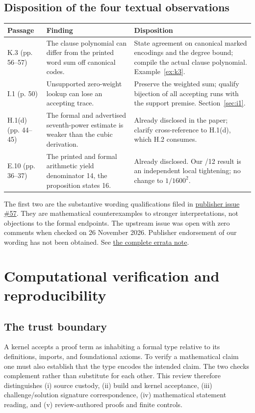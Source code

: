 \documentclass[11pt,letterpaper]{article}
\theoremstyle{definition}\newtheorem{definition}[theorem]{Definition}\newtheorem{example}[theorem]{Example}
\theoremstyle{remark}\newtheorem{remark}[theorem]{Remark}
\newcommand{\aud}[2]{\href{https://github.com/nousentllc/VP-VNP-Review/blob/567303d0bcf4f9d54390437b137752446e58ccd6/#1}{#2}}
\begin{document}
\subsection{Disposition of the four textual observations}
\begin{longtable}{@{}p{.13\linewidth}p{.40\linewidth}p{.39\linewidth}@{}}
\toprule
Passage & Finding & Disposition \\\midrule\endhead
K.3 (pp. 56--57) & The clause polynomial can differ from the printed word sum off canonical codes. & State agreement on canonical marked encodings and the degree bound; compile the actual clause polynomial. Example~\ref{ex:k3}.\\[3pt]
I.1 (p. 50) & Unsupported zero-weight lookup can lose an accepting trace. & Preserve the weighted sum; qualify bijection of all accepting runs with the support premise. Section~\ref{sec:i1}.\\[3pt]
H.1(d) (pp. 44--45) & The formal and advertised seventh-power estimate is weaker than the cubic derivation. & Already disclosed in the paper; clarify cross-reference to H.1(d), which H.2 consumes.\\[3pt]
E.10 (pp. 36--37) & The printed and formal arithmetic yield denominator 14, the proposition states 16. & Already disclosed. Our /12 result is an independent local tightening; no change to $1/1600^2$.\\
\bottomrule
\end{longtable}
The first two are the substantive wording qualifications filed in \href{https://github.com/anthropics/formal-math/issues/57}{publisher issue \#57}. They are mathematical counterexamples to stronger interpretations, not objections to the formal endpoints. The upstream issue was open with zero comments when checked on 26 November 2026. Publisher endorsement of our wording has not been obtained. See \aud{passes/publisher-errata.md}{the complete errata note}.

\section{Computational verification and reproducibility}\label{sec:formal}
\subsection{The trust boundary}
A kernel accepts a proof term as inhabiting a formal type relative to its definitions, imports, and foundational axioms. To verify a mathematical claim one must also establish that the type encodes the intended claim. The two checks complement rather than substitute for each other. This review therefore distinguishes (i) source custody, (ii) build and kernel acceptance, (iii) challenge/solution signature correspondence, (iv) mathematical statement reading, and (v) review-authored proofs and finite controls.
\end{document}
